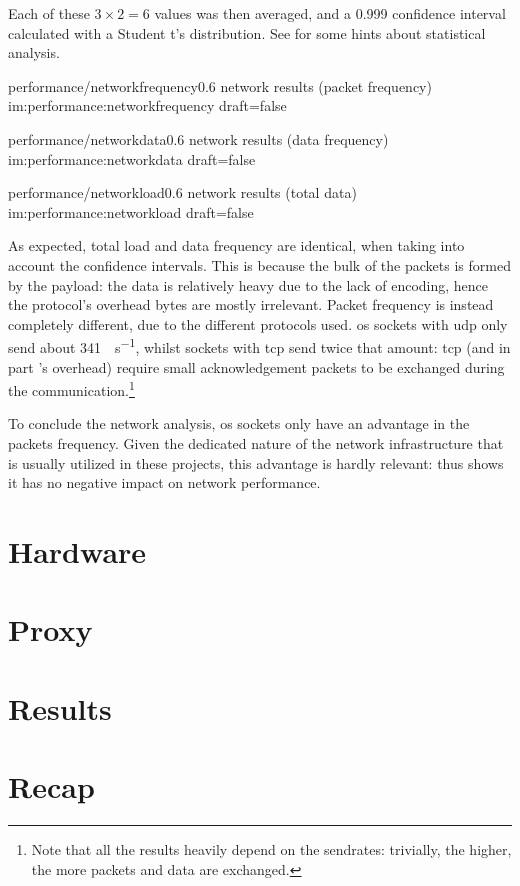 \FLOATnoindent Each of these $3\times2=6$ values was then averaged, and a \num{0,999} confidence interval calculated with a Student t's distribution. See  for some hints about statistical analysis.

\begin{image}
	{performance/networkfrequency}{0.6}
	{network results (packet frequency)}
	{im:performance:networkfrequency}
	{draft=false}
\end{image}

\begin{image}
	{performance/networkdata}{0.6}
	{network results (data frequency)}
	{im:performance:networkdata}
	{draft=false}
\end{image}

\begin{image}
	{performance/networkload}{0.6}
	{network results (total data)}
	{im:performance:networkload}
	{draft=false}
\end{image}

As expected, total load and data frequency are identical, when taking into account the confidence intervals. This is because the bulk of the packets is formed by the payload: the data is relatively heavy due to the lack of encoding, hence the protocol's overhead bytes are mostly irrelevant. Packet frequency is instead completely different, due to the different protocols used. \gls{os} sockets with \gls{udp} only send about \SI{341}{\packets\per\second}, whilst  sockets with \gls{tcp} send twice that amount: \gls{tcp} (and in part 's overhead) require small acknowledgement packets to be exchanged during the communication.\footnote{Note that all the results heavily depend on the sendrates: trivially, the higher, the more packets and data are exchanged.}

To conclude the network analysis, \gls{os} sockets only have an advantage in the packets frequency. Given the dedicated nature of the network infrastructure that is usually utilized in these projects, this advantage is hardly relevant:  thus shows it has no negative impact on network performance.

\section{Hardware}\label{sc:performance:hardware}

\section{Proxy}\label{sc:performance:proxy}

\section{Results}\label{sc:performance:results}

\section{Recap}\label{sc:performance:recap}

